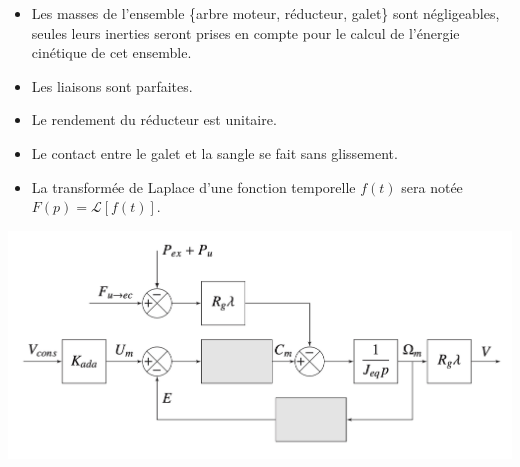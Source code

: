 \begin{itemize}
  \item Les masses de l'ensemble \{arbre moteur, réducteur, galet\} sont négligeables, seules leurs inerties seront prises en compte pour le calcul de l'énergie cinétique de cet ensemble.

  \item Les liaisons sont parfaites.

  \item Le rendement du réducteur est unitaire.

  \item Le contact entre le galet et la sangle se fait sans glissement.

  \item La transformée de Laplace d'une fonction temporelle $f(t)$ sera notée $F(p)=\mathcal{L}[f(t)]$.

\end{itemize}


\fi


\ifprof


  {
  \begin{center}
  \includegraphics[width=1.0\textwidth]{images/DR5_schema_bloc0}
  \end{center}
  }


